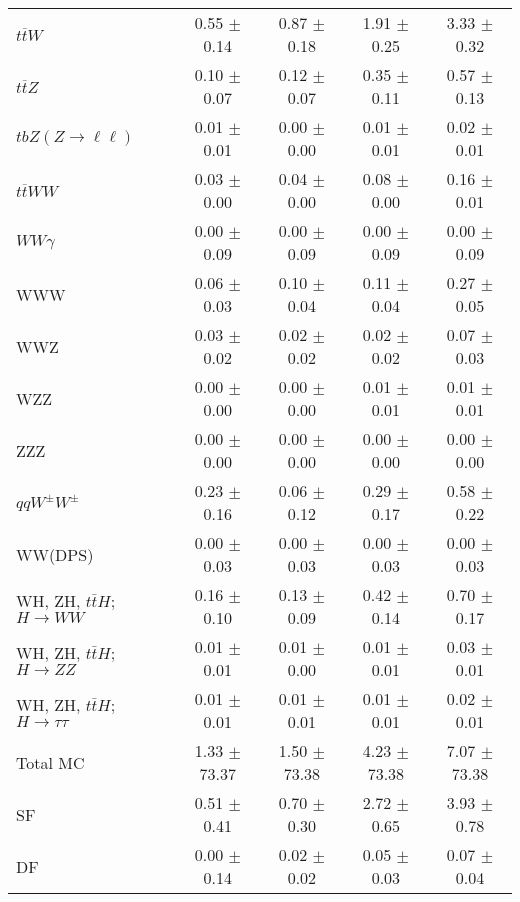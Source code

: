 \begin{tabular}{l|cccc}
                   $t\overline{t}W$ &  0.55 $\pm$  0.14 &  0.87 $\pm$  0.18 &  1.91 $\pm$  0.25 &  3.33 $\pm$  0.32 \\
                   $t\overline{t}Z$ &  0.10 $\pm$  0.07 &  0.12 $\pm$  0.07 &  0.35 $\pm$  0.11 &  0.57 $\pm$  0.13 \\
    $tbZ (Z \rightarrow \ell \ell)$ &  0.01 $\pm$  0.01 &  0.00 $\pm$  0.00 &  0.01 $\pm$  0.01 &  0.02 $\pm$  0.01 \\
                  $t\overline{t}WW$ &  0.03 $\pm$  0.00 &  0.04 $\pm$  0.00 &  0.08 $\pm$  0.00 &  0.16 $\pm$  0.01 \\
                         $WW\gamma$ &  0.00 $\pm$  0.09 &  0.00 $\pm$  0.09 &  0.00 $\pm$  0.09 &  0.00 $\pm$  0.09 \\
                                WWW &  0.06 $\pm$  0.03 &  0.10 $\pm$  0.04 &  0.11 $\pm$  0.04 &  0.27 $\pm$  0.05 \\
                                WWZ &  0.03 $\pm$  0.02 &  0.02 $\pm$  0.02 &  0.02 $\pm$  0.02 &  0.07 $\pm$  0.03 \\
                                WZZ &  0.00 $\pm$  0.00 &  0.00 $\pm$  0.00 &  0.01 $\pm$  0.01 &  0.01 $\pm$  0.01 \\
                                ZZZ &  0.00 $\pm$  0.00 &  0.00 $\pm$  0.00 &  0.00 $\pm$  0.00 &  0.00 $\pm$  0.00 \\
                 $qqW^{\pm}W^{\pm}$ &  0.23 $\pm$  0.16 &  0.06 $\pm$  0.12 &  0.29 $\pm$  0.17 &  0.58 $\pm$  0.22 \\
                            WW(DPS) &  0.00 $\pm$  0.03 &  0.00 $\pm$  0.03 &  0.00 $\pm$  0.03 &  0.00 $\pm$  0.03 \\
WH, ZH, $t\bar{t}H$; $H \rightarrow WW$ &  0.16 $\pm$  0.10 &  0.13 $\pm$  0.09 &  0.42 $\pm$  0.14 &  0.70 $\pm$  0.17 \\
WH, ZH, $t\bar{t}H$; $H \rightarrow ZZ$ &  0.01 $\pm$  0.01 &  0.01 $\pm$  0.00 &  0.01 $\pm$  0.01 &  0.03 $\pm$  0.01 \\
WH, ZH, $t\bar{t}H$; $H \rightarrow \tau\tau$ &  0.01 $\pm$  0.01 &  0.01 $\pm$  0.01 &  0.01 $\pm$  0.01 &  0.02 $\pm$  0.01 \\
\hline\hline
                           Total MC &  1.33 $\pm$ 73.37 &  1.50 $\pm$ 73.38 &  4.23 $\pm$ 73.38 &  7.07 $\pm$ 73.38 \\
\hline
                                 SF &  0.51 $\pm$  0.41 &  0.70 $\pm$  0.30 &  2.72 $\pm$  0.65 &  3.93 $\pm$  0.78 \\
                                 DF &  0.00 $\pm$  0.14 &  0.02 $\pm$  0.02 &  0.05 $\pm$  0.03 &  0.07 $\pm$  0.04 \\

\end{tabular}

